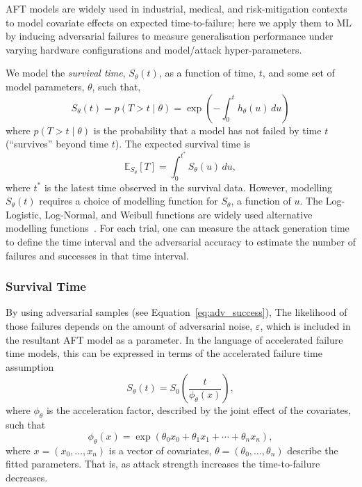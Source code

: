 \documentclass[conference]{IEEEtran}%
\begin{document}
AFT models are widely used in industrial, medical, and risk-mitigation contexts~\cite{kleinbaum1996survival,aft_models} to model covariate effects on expected time-to-failure; here we apply them to ML by inducing adversarial failures to measure generalisation performance under varying hardware configurations and model/attack hyper-parameters.

We model the \textit{survival time}, $S_{\theta}(t)$, as a function of time, $t$, and some set of model parameters, $\theta$, such that,
\[
    S_{\theta}(t) = p(T>t \mid \theta) = \exp\left(-\int_0^t h_{\theta}(u) \, du\right)
\]
where $p(T>t \mid \theta)$ is the probability that a model has not failed by time $t$ (``survives'' beyond time $t$). 
The expected survival time is
\begin{equation}
	\mathbb{E}_{S_\theta}[T] = \int_0^{t^*} S_\theta(u) \,du,
    \label{eq:expectation}
\end{equation}
where $t^*$ is the latest time observed in the survival data. 
However, modelling $S_{\theta}(t)$ requires a choice of modelling function for $S_{\theta}$, a function of $u$. 
The Log-Logistic, Log-Normal, and Weibull functions are widely used alternative modelling functions~\cite{kleinbaum1996survival,meyers_aft}. 
For each trial, one can measure the attack generation time to define the time interval and the adversarial accuracy to estimate the number of failures and successes in that time interval.

\subsubsection{Survival Time}
\label{accelerated}
By using adversarial samples (see Equation~\ref{eq:adv_success}), 
The likelihood of those failures depends on the amount of adversarial noise, $\varepsilon$, which is included in the resultant AFT model as a parameter.
In the language of accelerated failure time models, this can be expressed in terms of the accelerated failure time assumption~\cite{kleinbaum1996survival}
\begin{equation} \label{assumption}
    S_\theta(t) = S_0 \left( \frac{t}{\phi_\theta(x)} \right),
\end{equation}
where $\phi_\theta$ is the acceleration factor, described by the joint effect of the covariates, such that
\[
    \phi_{\theta}(x) = \exp{ \left( \theta_{0} x_{0} + \theta_{1} x_{1} + \cdots + \theta_{n} x_{n} \right) },
\]
where $x=(x_0, \ldots, x_n)$ is a vector of covariates, $\theta=(\theta_0, \ldots, \theta_n)$ describe the fitted parameters. 
That is, as attack strength increases the time-to-failure decreases.
\end{document}
